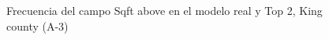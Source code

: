 \begin{figure}[H]
    \centering
    
    \caption{Frecuencia del campo Sqft above en el modelo real y Top 2, King county (A-3)}
    \label{frecuency-top2-sqft above}
\end{figure}